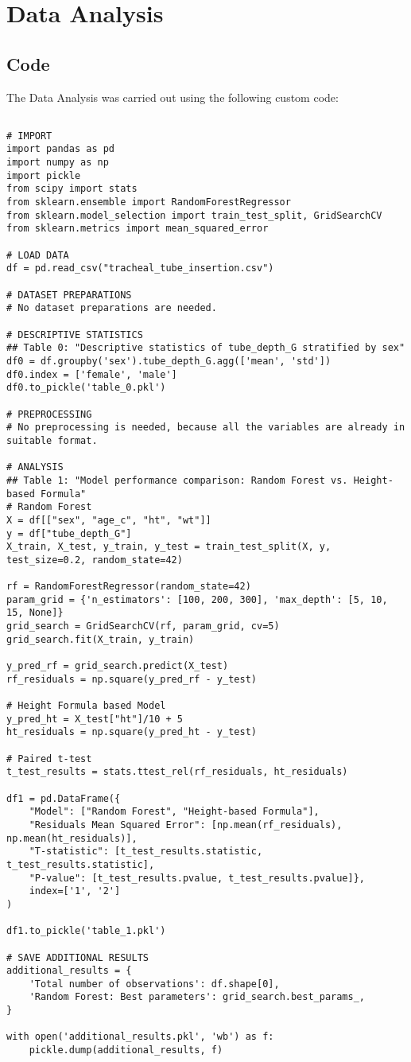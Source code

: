 \documentclass[11pt]{article}
\begin{document}
\section{Data Analysis}
\subsection{{Code}}
The Data Analysis was carried out using the following custom code:

\begin{verbatim}

# IMPORT
import pandas as pd
import numpy as np
import pickle
from scipy import stats
from sklearn.ensemble import RandomForestRegressor
from sklearn.model_selection import train_test_split, GridSearchCV
from sklearn.metrics import mean_squared_error

# LOAD DATA
df = pd.read_csv("tracheal_tube_insertion.csv")

# DATASET PREPARATIONS
# No dataset preparations are needed.

# DESCRIPTIVE STATISTICS
## Table 0: "Descriptive statistics of tube_depth_G stratified by sex"
df0 = df.groupby('sex').tube_depth_G.agg(['mean', 'std'])
df0.index = ['female', 'male']
df0.to_pickle('table_0.pkl')

# PREPROCESSING
# No preprocessing is needed, because all the variables are already in suitable format.

# ANALYSIS
## Table 1: "Model performance comparison: Random Forest vs. Height-based Formula"
# Random Forest
X = df[["sex", "age_c", "ht", "wt"]]
y = df["tube_depth_G"]
X_train, X_test, y_train, y_test = train_test_split(X, y, test_size=0.2, random_state=42)

rf = RandomForestRegressor(random_state=42)
param_grid = {'n_estimators': [100, 200, 300], 'max_depth': [5, 10, 15, None]} 
grid_search = GridSearchCV(rf, param_grid, cv=5)
grid_search.fit(X_train, y_train)

y_pred_rf = grid_search.predict(X_test)
rf_residuals = np.square(y_pred_rf - y_test)

# Height Formula based Model
y_pred_ht = X_test["ht"]/10 + 5
ht_residuals = np.square(y_pred_ht - y_test)

# Paired t-test
t_test_results = stats.ttest_rel(rf_residuals, ht_residuals)

df1 = pd.DataFrame({
    "Model": ["Random Forest", "Height-based Formula"],
    "Residuals Mean Squared Error": [np.mean(rf_residuals), np.mean(ht_residuals)],
    "T-statistic": [t_test_results.statistic, t_test_results.statistic],
    "P-value": [t_test_results.pvalue, t_test_results.pvalue]},
    index=['1', '2']
)

df1.to_pickle('table_1.pkl')

# SAVE ADDITIONAL RESULTS
additional_results = {
    'Total number of observations': df.shape[0], 
    'Random Forest: Best parameters': grid_search.best_params_,
}

with open('additional_results.pkl', 'wb') as f:
    pickle.dump(additional_results, f)

\end{verbatim}
\end{document}
